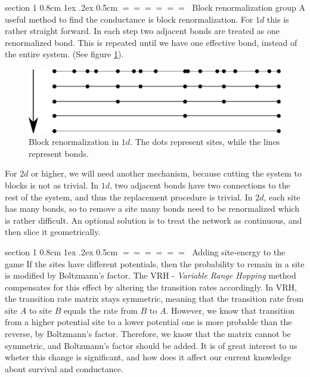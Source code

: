 \documentclass[onecolumn,fleqn,notitlepage,secnumarabic]{revtex4}
\makeatletter
\def\section{%
  \@startsection
    {section}%
    {1}%
    {\z@}%
    {0.8cm \@plus1ex \@minus .2ex}%
    {0.5cm}%
    {\Large\bf $=\!=\!=\!=\!=\!=\;$}%
}%
\makeatother
\begin{document}
\section{Block renormalization group}
A useful method to find the conductance is block renormalization. For $1d$ this is rather straight forward. In each step two adjacent bonds are treated as one renormalized bond. This is repeated until we have one effective bond, instead of the entire system. (See figure \ref{fig:renorm_group}). 
\begin{figure}
    \includegraphics[clip]{rp_renorm_group}
    \caption{Block renormalization in $1d$. The dots represent sites, while the lines represent bonds.}
    \label{fig:renorm_group}
\end{figure}

For $2d$ or higher, we will need another mechanism, because cutting the system to blocks is not as trivial. In $1d$, two adjacent bonds have two connections to the rest of the system, and thus the replacement procedure is trivial. In $2d$, each site has many bonds, so to remove a site many bonds need to be renormalized which is rather difficult. An optional solution is to treat the network as continuous, and then slice it geometrically.


\section{Adding site-energy to the game} \label{sec:vrh}
If the sites have different potentials, then the probability to remain in a site is modified by Boltzmann's factor. The VRH - \emph{Variable Range Hopping} method compensates for this effect by altering the transition rates accordingly. In VRH, the transition rate matrix stays symmetric, meaning that the transition rate from site $A$ to site $B$ equals the rate from $B$ to $A$. However, we know that transition from a higher potential site to a lower potential one is more probable than the reverse, by Boltzmann's factor. Therefore, we know that the matrix cannot be symmetric, and Boltzmann's factor should be added. It is of great interest to us wheter this change is significant, and how does it affect our current knowledge about survival and conductance.


%

\end{document}
